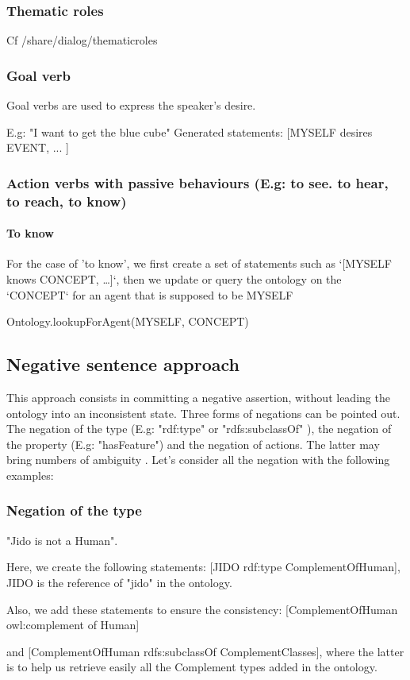 \documentclass[twoside,a4paper,10pt]{report}
\newcommand{\dokutitleleveltree}[1]{\subsection{#1}}
\newcommand{\dokutitlelevelfour}[1]{\subsubsection{#1}}
\newcommand{\dokutitlelevelfive}[1]{\paragraph{#1}}
\begin{document}
\dokutitlelevelfour{Thematic roles}
 
Cf /share/dialog/thematic{\textunderscore}roles


\dokutitlelevelfour{Goal verb}

Goal verbs are used to express the speaker's desire. 


\small
\begin{verbatimtab}
  
  E.g: "I want to get the blue cube"
  Generated statements: 
      [MYSELF desires EVENT, 
      ...
      ]
\end{verbatimtab}
\normalsize

\dokutitlelevelfour{Action verbs with passive behaviours (E.g: to see. to hear, to reach, to know)}

\small
\begin{verbatimtab}
\end{verbatimtab}
\normalsize

\dokutitlelevelfive{To know}

For the case of 'to know', we first create a set of statements such as `[MYSELF knows CONCEPT, \ldots{}]`, then we update or query the ontology on the `CONCEPT` for an agent that is supposed to be MYSELF


\small
\begin{verbatimtab}
      Ontology.lookupForAgent(MYSELF, CONCEPT)
             
\end{verbatimtab}
\normalsize

\dokutitleleveltree{Negative sentence approach}
\label{51e3775766a7025963abe3551cc8889c}%
This approach consists in committing a negative assertion, without leading the ontology into an inconsistent state. Three forms of negations can be pointed out.
The negation of the type (E.g: "rdf:type" or "rdfs:subclassOf" ), the negation of the property (E.g: "hasFeature") and the negation of actions. The latter may bring numbers of ambiguity .
Let's consider all the negation with the following examples:



\dokutitlelevelfour{Negation of the type}

\small
\begin{verbatimtab}
  
  "Jido is not a Human".
  
  Here, we create the following statements:
  [JIDO rdf:type ComplementOfHuman], JIDO is the reference of "jido" in the ontology.
  
  Also, we add these statements to ensure the consistency:
  [ComplementOfHuman owl:complement of Human]
  
  and 
  [ComplementOfHuman rdfs:subclassOf ComplementClasses], where the latter is to help us retrieve
easily all the Complement types added in the ontology.
  
\end{verbatimtab}
\normalsize
\end{document}

